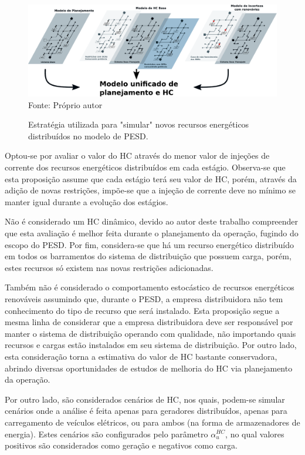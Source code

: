 \begin{figure}[ht]
 	\centering
    \caption{Estratégia utilizada para "simular"\; novos recursos energéticos distribuídos no modelo de PESD.}
    \includegraphics[width=1\textwidth]{cap3/modelo-new.pdf}\\
    Fonte: Próprio autor
    \label{fig:model_hc}
\end{figure}

Optou-se por avaliar o valor do \ac{HC} através do menor valor de injeções de corrente dos recursos energéticos distribuídos em cada estágio. Observa-se que esta proposição assume que cada estágio terá seu valor de \ac{HC}, porém, através da adição de novas restrições, impõe-se que a injeção de corrente deve no mínimo se manter igual durante a evolução dos estágios. 

Não é considerado um \ac{HC} dinâmico, devido ao autor deste trabalho compreender que esta avaliação é melhor feita durante o planejamento da operação, fugindo do escopo do \ac{PESD}. Por fim, considera-se que há um recurso energético distribuído em todos os barramentos do sistema de distribuição que possuem carga, porém, estes recursos só existem nas novas restrições adicionadas.

Também não é considerado o comportamento estocástico de recursos energéticos renováveis assumindo que, durante o \ac{PESD}, a empresa distribuidora não tem conhecimento do tipo de recurso que será instalado. Esta proposição segue a mesma linha de considerar que a empresa distribuidora deve ser responsável por manter o sistema de distribuição operando com qualidade, não importando quais recursos e cargas estão instalados em seu sistema de distribuição. Por outro lado, esta consideração torna a estimativa do valor de  \ac{HC} bastante conservadora, abrindo diversas oportunidades de estudos de melhoria do \ac{HC} via planejamento da operação.

Por outro lado, são considerados cenários de \ac{HC}, nos quais, podem-se simular cenários onde a análise é feita apenas para geradores distribuídos, apenas para carregamento de veículos elétricos, ou para ambos (na forma de armazenadores de energia). Estes cenários são configurados pelo parâmetro $\alpha^{HC}_u$, no qual valores positivos são considerados como geração e negativos como carga.

